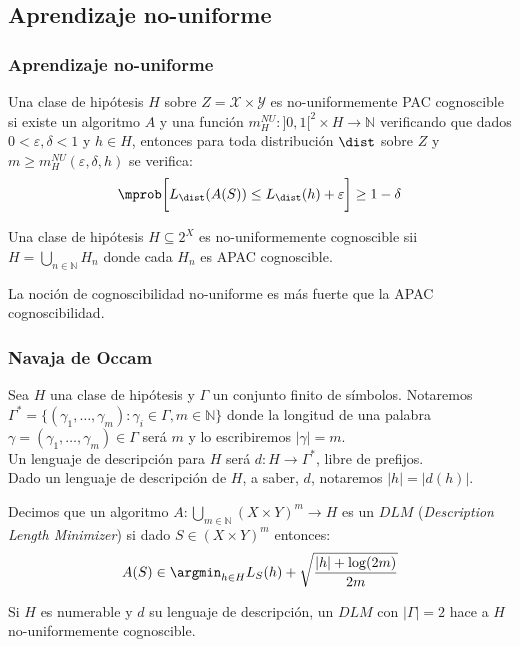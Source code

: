 \subsection{Aprendizaje no-uniforme}
\begin{frame}\frametitle{Aprendizaje no-uniforme}
 \begin{definition}
  Una clase de hipótesis $H$ sobre $Z=\mathcal{X} \times \mathcal{Y}$ es no-uniformemente PAC cognoscible si existe
  un algoritmo $A$ y una función $m_{H}^{NU} : ]0,1[^2 \times H \rightarrow \mathbb{N}$ verificando que dados 
  $0 < \varepsilon, \delta < 1$ y $h \in H$, entonces para toda distribución $\dist$ sobre $Z$ y
  $m\ge m_{H}^{NU} (\varepsilon, \delta, h)$ se verifica:
  \[
    \mprob\bigg[L_{\dist}(A(S)) \le L_{\dist}(h) + \varepsilon\bigg] \ge 1-\delta
  \]
 \end{definition}

 \begin{theorem}
  Una clase de hipótesis $H \subseteq 2^X$ es no-uniformemente cognoscible sii $H = \bigcup_{n\in\mathbb{N}} H_n$ donde
  cada $H_n$ es APAC cognoscible.
 \end{theorem}
 
 \begin{corollary}
  La noción de cognoscibilidad no-uniforme es más fuerte que la APAC cognoscibilidad.
 \end{corollary}
\end{frame}

\begin{frame}\frametitle{Navaja de Occam}
 \begin{definition}
  Sea $H$ una clase de hipótesis y $\Gamma$ un conjunto finito de símbolos. Notaremos 
  $\Gamma^{\ast} = \{(\gamma_1, \ldots, \gamma_m): \gamma_i \in \Gamma, m\in \mathbb{N}\}$
  donde la longitud de una palabra $\gamma = (\gamma_1, \ldots, \gamma_m) \in \Gamma$ será $m$ y lo escribiremos $|\gamma| = m$.\\
  \medskip
  Un lenguaje de descripción para $H$ será $d: H \rightarrow \Gamma^{\ast}$, libre de prefijos.\\
  \medskip  
  Dado un lenguaje de descripción de $H$, a saber, $d$, notaremos $|h| = |d(h)|$.
 \end{definition}
 
 \begin{definition}
  Decimos que un algoritmo $A: \underset{m\in \mathbb{N}}{\bigcup} (X\times Y)^m \rightarrow H$ es un $DLM$ 
  (\textit{Description Length Minimizer}) si dado $S \in (X\times Y)^m$ entonces:
  \[
   A(S) \in \argmin_{h\in H} L_S(h) + \sqrt{\frac{|h| + \log(2m)}{2m}} 
  \]
 \end{definition}
 
 \vspace{-2em}
 
 \begin{theorem}
 Si $H$ es numerable y $d$ su lenguaje de descripción, un $DLM$ con $|\Gamma| = 2$ hace a $H$ no-uniformemente cognoscible.
 \end{theorem}
\end{frame}